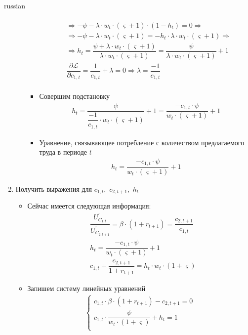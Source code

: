 \documentclass[fleqn]{article}
\begin{document}
\begin{otherlanguage*}{russian}
\begin{enumerate}[label=\alph*), leftmargin=*]
\begin{enumerate}[label=(\arabic*)]
\begin{itemize}
\begin{align*}
\\
&\Rightarrow  - \psi - \lambda \cdot w_t \cdot (\varsigma +1 ) \cdot (1 - h_t) = 0 \Rightarrow
\\
& \Rightarrow - \psi - \lambda \cdot w_t \cdot (\varsigma +1 ) = - h_t \cdot \lambda \cdot w_t \cdot (\varsigma + 1) \Rightarrow 
\\
&\Rightarrow h_t = \dfrac{\psi + \lambda \cdot w_t \cdot (\varsigma + 1)}{\lambda \cdot w_t \cdot (\varsigma + 1) } = \dfrac{\psi}{\lambda \cdot w_t \cdot (\varsigma + 1) } + 1
\\
&\dfrac{\partial \mathcal{L}}{\partial c_{1, t}} = \dfrac{1}{c_{1, t}} + \lambda = 0 \Rightarrow \lambda = \dfrac{-1}{c_{1, t}} 
\\
\end{align*}
\item Совершим подстановку
\begin{align*}
h_t = \dfrac{\psi}{\dfrac{-1}{c_{1, t}} \cdot w_t \cdot (\varsigma +1)} + 1 =  \dfrac{- c_{1,t }  \cdot \psi}{w_t \cdot (\varsigma +1)} + 1
\end{align*} 
\item Уравнение, связывающее потребление с количеством предлагаемого труда в периоде $ t $ 
\begin{align}
h_t =  \dfrac{- c_{1, t} \cdot \psi}{w_t \cdot (\varsigma +1)} + 1
\end{align}
\end{itemize}
\end{enumerate}
\item Получить выражения для $ c_{1,t}, \,\, c_{2, t+1}, \,\, h_t $ 
\begin{itemize}
\item Сейчас имеется следующая информация:
\begin{align*}
&\dfrac{U^{'}_{C_{1,t}} }{U^{'}_{C_{2,t+1}} } = \beta \cdot (1 + r_{t+1}) = \dfrac{c_{2, t+1}}{c_{1, t}} 
\\
&h_t =  \dfrac{- c_{1, t} \cdot \psi}{w_t \cdot (\varsigma +1)} + 1 
\\
&c_{1,t} + \dfrac{c_{2,t+1}}{1 + r_{t+1}} = h_t \cdot w_t \cdot (1 + \varsigma) 
\end{align*}	
\item Запишем систему линейных уравнений
\begin{align}
\begin{cases}
c_{1,t} \cdot \beta \cdot (1 + r_{t+1}) - c_{2, t+1}  = 0 \\
c_{1, t} \cdot \dfrac{\psi}{w_t \cdot (1 + \varsigma)} + h_t = 1 \\

\end{cases}
\end{align}
\end{itemize}
\end{enumerate}
\end{otherlanguage*}
\end{document}
